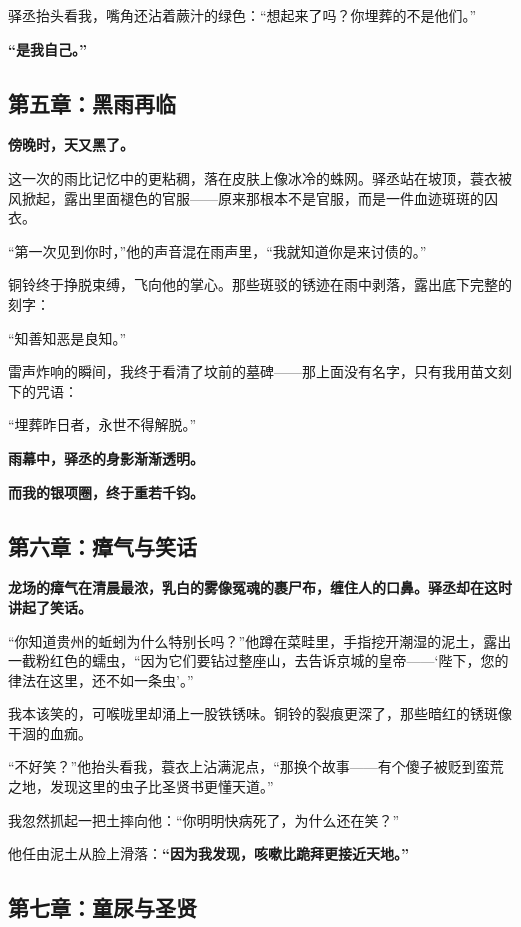 \documentclass{article}
\begin{document}
	驿丞抬头看我，嘴角还沾着蕨汁的绿色：“想起来了吗？你埋葬的不是他们。”  
	
	\textbf{“是我自己。” } 
	
	
	\subsection{第五章：黑雨再临}
	
	\textbf{傍晚时，天又黑了。 } 
	
	这一次的雨比记忆中的更粘稠，落在皮肤上像冰冷的蛛网。驿丞站在坡顶，蓑衣被风掀起，露出里面褪色的官服——原来那根本不是官服，而是一件血迹斑斑的囚衣。  
	
	“第一次见到你时，”他的声音混在雨声里，“我就知道你是来讨债的。”  
	
	铜铃终于挣脱束缚，飞向他的掌心。那些斑驳的锈迹在雨中剥落，露出底下完整的刻字：  
	
	“知善知恶是良知。”
	
	雷声炸响的瞬间，我终于看清了坟前的墓碑——那上面没有名字，只有我用苗文刻下的咒语：  
	
	“埋葬昨日者，永世不得解脱。”
	
	\textbf{雨幕中，驿丞的身影渐渐透明。 } 
	
	\textbf{而我的银项圈，终于重若千钧。 }
	
	
	\subsection{第六章：瘴气与笑话}
	
	\textbf{龙场的瘴气在清晨最浓，乳白的雾像冤魂的裹尸布，缠住人的口鼻。驿丞却在这时讲起了笑话。}
	
	“你知道贵州的蚯蚓为什么特别长吗？”他蹲在菜畦里，手指挖开潮湿的泥土，露出一截粉红色的蠕虫，“因为它们要钻过整座山，去告诉京城的皇帝——‘陛下，您的律法在这里，还不如一条虫’。”  
	
	我本该笑的，可喉咙里却涌上一股铁锈味。铜铃的裂痕更深了，那些暗红的锈斑像干涸的血痂。  
	
	“不好笑？”他抬头看我，蓑衣上沾满泥点，“那换个故事——有个傻子被贬到蛮荒之地，发现这里的虫子比圣贤书更懂天道。”  
	
	我忽然抓起一把土摔向他：“你明明快病死了，为什么还在笑？”  
	
	他任由泥土从脸上滑落：\textbf{“因为我发现，咳嗽比跪拜更接近天地。”  }
	
	\subsection{第七章：童尿与圣贤}
	
\end{document}
